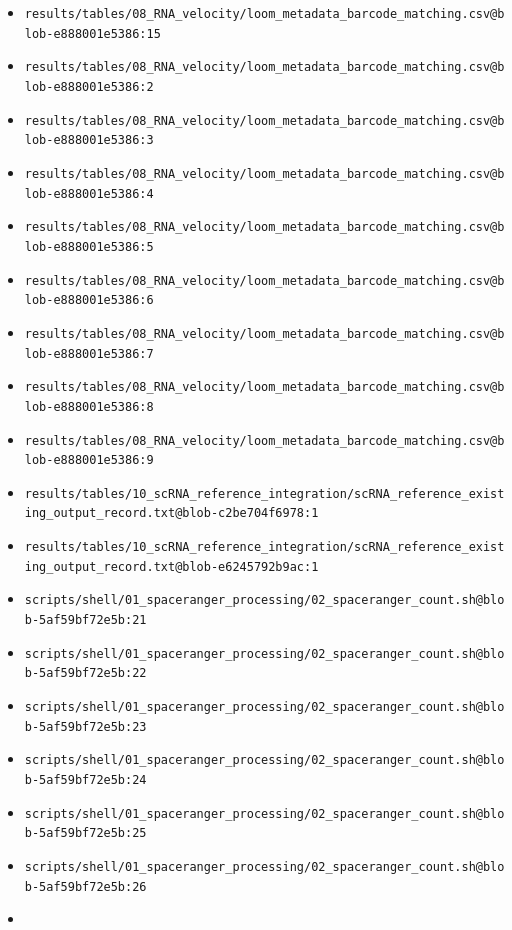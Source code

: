 \documentclass[
]{article}
\begin{document}
\begin{itemize}
\item
  \texttt{results/tables/08\_RNA\_velocity/loom\_metadata\_barcode\_matching.csv@blob-e888001e5386:15}
\item
  \texttt{results/tables/08\_RNA\_velocity/loom\_metadata\_barcode\_matching.csv@blob-e888001e5386:2}
\item
  \texttt{results/tables/08\_RNA\_velocity/loom\_metadata\_barcode\_matching.csv@blob-e888001e5386:3}
\item
  \texttt{results/tables/08\_RNA\_velocity/loom\_metadata\_barcode\_matching.csv@blob-e888001e5386:4}
\item
  \texttt{results/tables/08\_RNA\_velocity/loom\_metadata\_barcode\_matching.csv@blob-e888001e5386:5}
\item
  \texttt{results/tables/08\_RNA\_velocity/loom\_metadata\_barcode\_matching.csv@blob-e888001e5386:6}
\item
  \texttt{results/tables/08\_RNA\_velocity/loom\_metadata\_barcode\_matching.csv@blob-e888001e5386:7}
\item
  \texttt{results/tables/08\_RNA\_velocity/loom\_metadata\_barcode\_matching.csv@blob-e888001e5386:8}
\item
  \texttt{results/tables/08\_RNA\_velocity/loom\_metadata\_barcode\_matching.csv@blob-e888001e5386:9}
\item
  \texttt{results/tables/10\_scRNA\_reference\_integration/scRNA\_reference\_existing\_output\_record.txt@blob-c2be704f6978:1}
\item
  \texttt{results/tables/10\_scRNA\_reference\_integration/scRNA\_reference\_existing\_output\_record.txt@blob-e6245792b9ac:1}
\item
  \texttt{scripts/shell/01\_spaceranger\_processing/02\_spaceranger\_count.sh@blob-5af59bf72e5b:21}
\item
  \texttt{scripts/shell/01\_spaceranger\_processing/02\_spaceranger\_count.sh@blob-5af59bf72e5b:22}
\item
  \texttt{scripts/shell/01\_spaceranger\_processing/02\_spaceranger\_count.sh@blob-5af59bf72e5b:23}
\item
  \texttt{scripts/shell/01\_spaceranger\_processing/02\_spaceranger\_count.sh@blob-5af59bf72e5b:24}
\item
  \texttt{scripts/shell/01\_spaceranger\_processing/02\_spaceranger\_count.sh@blob-5af59bf72e5b:25}
\item
  \texttt{scripts/shell/01\_spaceranger\_processing/02\_spaceranger\_count.sh@blob-5af59bf72e5b:26}
\item

\end{itemize}
\end{document}
